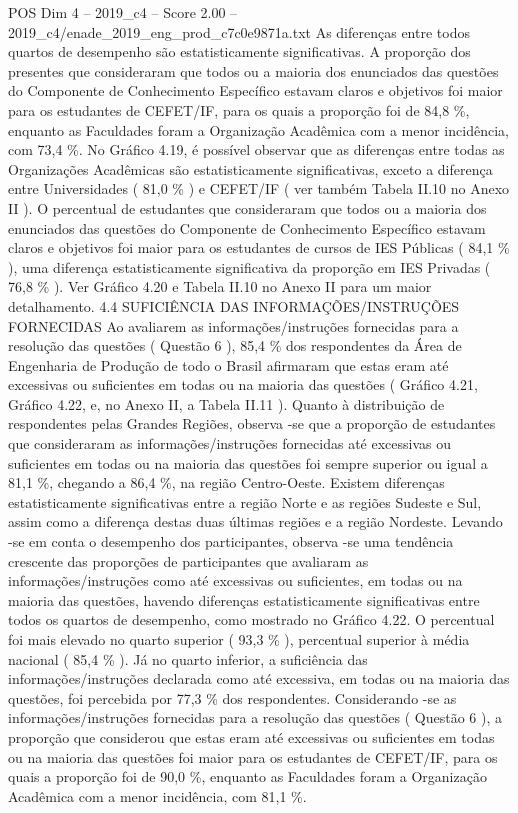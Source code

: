 \begin{textsample}{POS Dim 4 – 2019\_c4 – Score 2.00 – 2019\_c4/enade\_2019\_eng\_prod\_c7c0e9871a.txt}
As diferenças entre todos quartos de desempenho são estatisticamente significativas.
A proporção dos presentes que consideraram que todos ou a maioria dos enunciados das questões do Componente de Conhecimento Específico estavam claros e objetivos foi maior para os estudantes de CEFET/IF, para os quais a proporção foi de 84,8 \%, enquanto as Faculdades foram a Organização Acadêmica com a menor incidência, com 73,4 \%.
No Gráfico 4.19, é possível observar que as diferenças entre todas as Organizações Acadêmicas são estatisticamente significativas, exceto a diferença entre Universidades ( 81,0 \% ) e CEFET/IF ( ver também Tabela II.10 no Anexo II ).
O percentual de estudantes que consideraram que todos ou a maioria dos enunciados das questões do Componente de Conhecimento Específico estavam claros e objetivos foi maior para os estudantes de cursos de IES Públicas ( 84,1 \% ), uma diferença estatisticamente significativa da proporção em IES Privadas ( 76,8 \% ).
Ver Gráfico 4.20 e Tabela II.10 no Anexo II para um maior detalhamento. 4.4 SUFICIÊNCIA DAS INFORMAÇÕES/INSTRUÇÕES FORNECIDAS Ao avaliarem as informações/instruções fornecidas para a resolução das questões ( Questão 6 ), 85,4 \% dos respondentes da Área de Engenharia de Produção de todo o Brasil afirmaram que estas eram até excessivas ou suficientes em todas ou na maioria das questões ( Gráfico 4.21, Gráfico 4.22, e, no Anexo II, a Tabela II.11 ).
Quanto à distribuição de respondentes pelas Grandes Regiões, observa -se que a proporção de estudantes que consideraram as informações/instruções fornecidas até excessivas ou suficientes em todas ou na maioria das questões foi sempre superior ou igual a 81,1 \%, chegando a 86,4 \%, na região Centro-Oeste.
Existem diferenças estatisticamente significativas entre a região Norte e as regiões Sudeste e Sul, assim como a diferença destas duas últimas regiões e a região Nordeste.
Levando -se em conta o desempenho dos participantes, observa -se uma tendência crescente das proporções de participantes que avaliaram as informações/instruções como até excessivas ou suficientes, em todas ou na maioria das questões, havendo diferenças estatisticamente significativas entre todos os quartos de desempenho, como mostrado no Gráfico 4.22.
O percentual foi mais elevado no quarto superior ( 93,3 \% ), percentual superior à média nacional ( 85,4 \% ).
Já no quarto inferior, a suficiência das informações/instruções declarada como até excessiva, em todas ou na maioria das questões, foi percebida por 77,3 \% dos respondentes.
Considerando -se as informações/instruções fornecidas para a resolução das questões ( Questão 6 ), a proporção que considerou que estas eram até excessivas ou suficientes em todas ou na maioria das questões foi maior para os estudantes de CEFET/IF, para os quais a proporção foi de 90,0 \%, enquanto as Faculdades foram a Organização Acadêmica com a menor incidência, com 81,1 \%.

\end{textsample}
